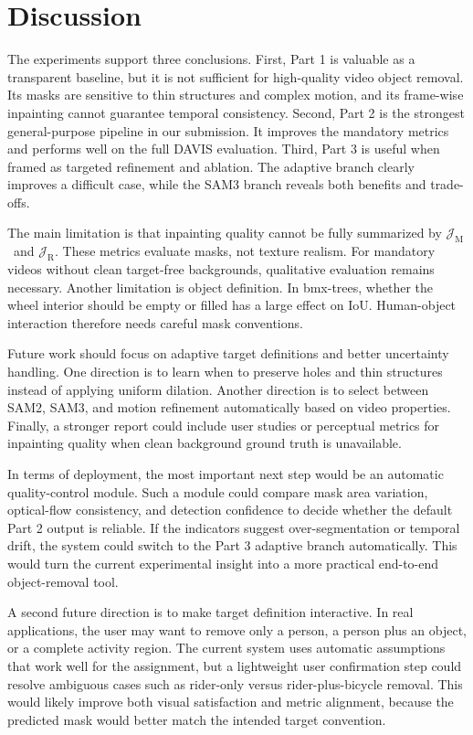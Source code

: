 \documentclass[10pt,twocolumn,letterpaper]{article}
\newcommand{\jm}{\ensuremath{\mathcal{J}_{\mathrm{M}}}}
\newcommand{\jr}{\ensuremath{\mathcal{J}_{\mathrm{R}}}}
\begin{document}
\FloatBarrier
\section{Discussion}
The experiments support three conclusions. First, Part 1 is valuable as a transparent baseline, but it is not sufficient for high-quality video object removal. Its masks are sensitive to thin structures and complex motion, and its frame-wise inpainting cannot guarantee temporal consistency. Second, Part 2 is the strongest general-purpose pipeline in our submission. It improves the mandatory metrics and performs well on the full DAVIS evaluation. Third, Part 3 is useful when framed as targeted refinement and ablation. The adaptive branch clearly improves a difficult case, while the SAM3 branch reveals both benefits and trade-offs.

The main limitation is that inpainting quality cannot be fully summarized by \jm\ and \jr. These metrics evaluate masks, not texture realism. For mandatory videos without clean target-free backgrounds, qualitative evaluation remains necessary. Another limitation is object definition. In bmx-trees, whether the wheel interior should be empty or filled has a large effect on IoU. Human-object interaction therefore needs careful mask conventions.

Future work should focus on adaptive target definitions and better uncertainty handling. One direction is to learn when to preserve holes and thin structures instead of applying uniform dilation. Another direction is to select between SAM2, SAM3, and motion refinement automatically based on video properties. Finally, a stronger report could include user studies or perceptual metrics for inpainting quality when clean background ground truth is unavailable.

In terms of deployment, the most important next step would be an automatic quality-control module. Such a module could compare mask area variation, optical-flow consistency, and detection confidence to decide whether the default Part 2 output is reliable. If the indicators suggest over-segmentation or temporal drift, the system could switch to the Part 3 adaptive branch automatically. This would turn the current experimental insight into a more practical end-to-end object-removal tool.

A second future direction is to make target definition interactive. In real applications, the user may want to remove only a person, a person plus an object, or a complete activity region. The current system uses automatic assumptions that work well for the assignment, but a lightweight user confirmation step could resolve ambiguous cases such as rider-only versus rider-plus-bicycle removal. This would likely improve both visual satisfaction and metric alignment, because the predicted mask would better match the intended target convention.
\end{document}

